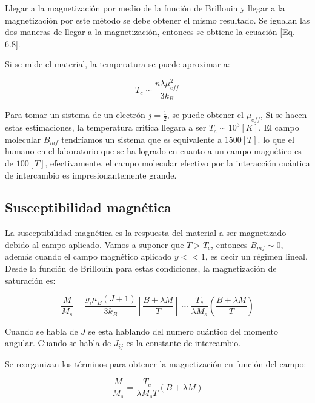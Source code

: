 \documentclass[11pt,fleqn]{book}
\begin{document}
Llegar a la magnetización por medio de la función de Brillouin y llegar a la magnetización por este método se debe obtener el mismo resultado. Se igualan las dos maneras de llegar a la magnetización, entonces se obtiene la ecuación \ref{Eq. 6.8}.

Si se mide el material, la temperatura se puede aproximar a:

\begin{equation}
    T_{c}\sim\frac{n\lambda\mu_{eff}^{2}}{3k_{B}}
    \label{Eq. 6.8a}
\end{equation}

Para tomar un sistema de un electrón $j=\frac{1}{2}$, se puede obtener el $\mu_{eff}$, Si se hacen estas estimaciones, la temperatura critica llegara a ser $T_{c}\sim10^{3}[K]$. El campo molecular $B_{mf}$ tendríamos un sistema que es equivalente a $1500[T]$. lo que el humano en el laboratorio que se ha logrado en cuanto a un campo magnético es de $100 [T]$, efectivamente, el campo molecular efectivo por la interacción cuántica de intercambio es impresionantemente grande. 

\subsection{Susceptibilidad magnética}

La susceptibilidad magnética es la respuesta del material a ser magnetizado debido al campo aplicado. Vamos a suponer que $T>T_{c}$, entonces $B_{mf}\sim0$, además cuando el campo magnético aplicado $y<<1$, es decir un régimen lineal. Desde la función de Brillouin para estas condiciones, la magnetización de saturación es:

\begin{equation*}
    \frac{M}{M_{s}}=\frac{g_{i}\mu_{B}(J+1)}{3k_{B}}\left[\frac{B+\lambda M}{T}\right]\sim\frac{T_{c}}{\lambda M_{s}}\left(\frac{B+\lambda M}{T}\right)
\end{equation*}

\begin{remark}
Cuando se habla de $J$ se esta hablando del numero cuántico del momento angular. Cuando se habla de $J_{ij}$ es la constante de intercambio.
\end{remark}

Se reorganizan los términos para obtener la magnetización en función del campo:

\begin{equation}
    \frac{M}{M_{s}}=\frac{T_{c}}{\lambda M_{s}T}(B+\lambda M)
    \label{Eq. 6.9}
\end{equation}
\end{document}
